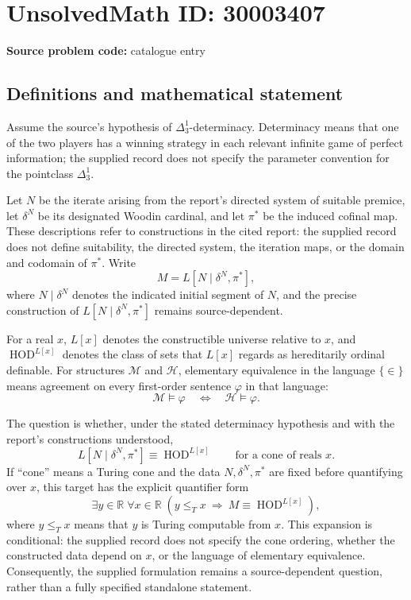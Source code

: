 \documentclass[11pt]{article}
\newcommand{\R}{\mathbb{R}}
\begin{document}
\section*{UnsolvedMath ID: 30003407}
\textbf{Source problem code:} catalogue entry
\subsection{Definitions and mathematical statement}
Assume the source's hypothesis of $\Delta^1_3$-determinacy. Determinacy means that one of the two players has a winning strategy in each relevant infinite game of perfect information; the supplied record does not specify the parameter convention for the pointclass $\Delta^1_3$.

Let $N$ be the iterate arising from the report's directed system of suitable premice, let $\delta^N$ be its designated Woodin cardinal, and let $\pi^*$ be the induced cofinal map. These descriptions refer to constructions in the cited report: the supplied record does not define suitability, the directed system, the iteration maps, or the domain and codomain of $\pi^*$. Write
\[
M=L[N\mid\delta^N,\pi^*],
\]
where $N\mid\delta^N$ denotes the indicated initial segment of $N$, and the precise construction of $L[N\mid\delta^N,\pi^*]$ remains source-dependent.

For a real $x$, $L[x]$ denotes the constructible universe relative to $x$, and $\operatorname{HOD}^{L[x]}$ denotes the class of sets that $L[x]$ regards as hereditarily ordinal definable. For structures $\mathcal M$ and $\mathcal H$, elementary equivalence in the language $\{\in\}$ means agreement on every first-order sentence $\varphi$ in that language:
\[
\mathcal M\models\varphi\quad\Longleftrightarrow\quad\mathcal H\models\varphi.
\]

The question is whether, under the stated determinacy hypothesis and with the report's constructions understood,
\[
L[N\mid\delta^N,\pi^*]\equiv\operatorname{HOD}^{L[x]}
\qquad\text{for a cone of reals }x.
\]
If ``cone'' means a Turing cone and the data $N,\delta^N,\pi^*$ are fixed before quantifying over $x$, this target has the explicit quantifier form
\[
\exists y\in\R\;\forall x\in\R\;
\left(y\leq_T x\ \Longrightarrow\ M\equiv\operatorname{HOD}^{L[x]}\right),
\]
where $y\leq_T x$ means that $y$ is Turing computable from $x$. This expansion is conditional: the supplied record does not specify the cone ordering, whether the constructed data depend on $x$, or the language of elementary equivalence. Consequently, the supplied formulation remains a source-dependent question, rather than a fully specified standalone statement.
\end{document}
